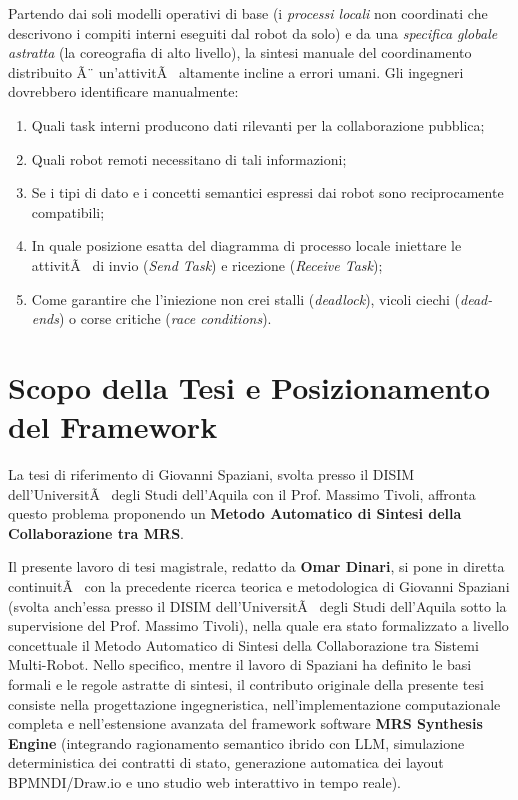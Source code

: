 ﻿\documentclass[11pt, a4paper]{report}
\begin{document}
Partendo dai soli modelli operativi di base (i \textit{processi locali} non coordinati che descrivono i compiti interni eseguiti dal robot da solo) e da una \textit{specifica globale astratta} (la coreografia di alto livello), la sintesi manuale del coordinamento distribuito Ã¨ un'attivitÃ  altamente incline a errori umani. Gli ingegneri dovrebbero identificare manualmente:
\begin{enumerate}
    \item Quali task interni producono dati rilevanti per la collaborazione pubblica;
    \item Quali robot remoti necessitano di tali informazioni;
    \item Se i tipi di dato e i concetti semantici espressi dai robot sono reciprocamente compatibili;
    \item In quale posizione esatta del diagramma di processo locale iniettare le attivitÃ  di invio (\textit{Send Task}) e ricezione (\textit{Receive Task});
    \item Come garantire che l'iniezione non crei stalli (\textit{deadlock}), vicoli ciechi (\textit{dead-ends}) o corse critiche (\textit{race conditions}).
\end{enumerate}

\section{Scopo della Tesi e Posizionamento del Framework}

La tesi di riferimento di Giovanni Spaziani, svolta presso il DISIM dell'UniversitÃ  degli Studi dell'Aquila con il Prof. Massimo Tivoli, affronta questo problema proponendo un \textbf{Metodo Automatico di Sintesi della Collaborazione tra MRS}.

Il presente lavoro di tesi magistrale, redatto da \textbf{Omar Dinari}, si pone in diretta continuitÃ  con la precedente ricerca teorica e metodologica di Giovanni Spaziani (svolta anch'essa presso il DISIM dell'UniversitÃ  degli Studi dell'Aquila sotto la supervisione del Prof. Massimo Tivoli), nella quale era stato formalizzato a livello concettuale il Metodo Automatico di Sintesi della Collaborazione tra Sistemi Multi-Robot. Nello specifico, mentre il lavoro di Spaziani ha definito le basi formali e le regole astratte di sintesi, il contributo originale della presente tesi consiste nella progettazione ingegneristica, nell'implementazione computazionale completa e nell'estensione avanzata del framework software \textbf{MRS Synthesis Engine} (integrando ragionamento semantico ibrido con LLM, simulazione deterministica dei contratti di stato, generazione automatica dei layout BPMNDI/Draw.io e uno studio web interattivo in tempo reale).
\end{document}
